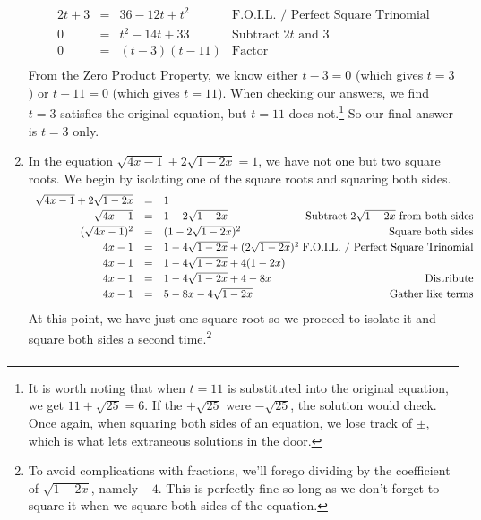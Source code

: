 \documentclass[10pt]{article}
\begin{document}
\begin{ex}
\begin{enumerate}
\[\begin{array}{rclr}
2t + 3 & = & 36-12t + t^2 & \text{F.O.I.L. / Perfect Square Trinomial} \\ [2pt]

0 & = & t^2 - 14t + 33 & \text{Subtract $2t$ and $3$} \\ [2pt]

0 & = & (t-3)(t-11) & \text{Factor} \\ \end{array} \] From the Zero Product Property, we know either $t - 3 = 0$ (which gives $t=3$) or $t-11 = 0$ (which gives $t=11$).  When checking our answers, we find $t = 3$ satisfies the original equation, but $t = 11$ does not.\footnote{It is worth noting that when $t=11$ is substituted into the original equation, we get $11 + \sqrt{25} = 6$.  If the $+\sqrt{25}$ were $-\sqrt{25}$, the solution would check. Once again, when squaring both sides of an equation, we lose track of $\pm$, which is what lets extraneous solutions in the door.}  So our final answer is $t = 3$ only.



\item In the equation $\sqrt{4x-1}  + 2\sqrt{1 - 2x} = 1$, we have not one but two square roots.  We begin by isolating one of the square roots and squaring both sides.\[ \begin{array}{rclr}

\sqrt{4x-1}  + 2\sqrt{1 - 2x} & = & 1 & \\ [2pt]

\sqrt{4x-1} & = & 1 - 2\sqrt{1-2x} & \hspace*{-.1in} \text{Subtract $2\sqrt{1 - 2x}$ from both sides} \\[2pt]

(\sqrt{4x-1})^2 & = & (1 - 2\sqrt{1-2x})^2 & \text{Square both sides} \\[2pt]

4x - 1 & = & 1 - 4\sqrt{1-2x} + (2\sqrt{1-2x})^2 & \hspace*{-.1in} \text{F.O.I.L. / Perfect Square Trinomial} \\[2pt]

4x - 1 & = & 1 - 4\sqrt{1-2x} + 4(1-2x) & \\[2pt]

4x - 1 & = & 1 - 4\sqrt{1-2x} + 4 - 8x & \text{Distribute} \\ [2pt]

4x - 1 & = & 5 - 8x - 4\sqrt{1-2x} & \text{Gather like terms} \\ \end{array} \] At this point, we have just one square root so we proceed to isolate it and square both sides a second time.\footnote{To avoid complications with fractions, we'll forego dividing by the coefficient of $\sqrt{1-2x}$, namely $-4$. This is perfectly fine so long as we don't forget to square it when we square both sides of the equation.} \[ \begin{array}{rclr}


\end{array}\]
\end{enumerate}
\end{ex}
\end{document}
